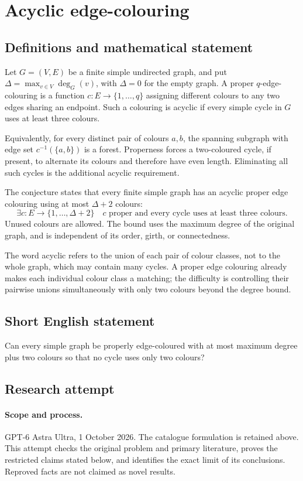 \documentclass[11pt,a4paper]{article}
\begin{document}
\section*{Acyclic edge-colouring}\label{statement}

\subsection{Definitions and mathematical statement}
Let $G=(V,E)$ be a finite simple undirected graph,
and put $\Delta=\max_{v\in V}\deg_G(v)$, with
$\Delta=0$ for the empty graph. A proper
$q$-edge-colouring is a function
$c:E\to\{1,\ldots,q\}$ assigning different
colours to any two edges sharing an endpoint.
Such a colouring is acyclic if every simple
cycle in $G$ uses at least three colours.

Equivalently, for every distinct pair of
colours $a,b$, the spanning subgraph with
edge set $c^{-1}(\{a,b\})$ is a forest.
Properness forces a two-coloured cycle,
if present, to alternate its colours and
therefore have even length. Eliminating
all such cycles is the additional acyclic
requirement.

The conjecture states that every finite
simple graph has an acyclic proper edge
colouring using at most $\Delta+2$ colours:
\[
 \exists c:E\to\{1,\ldots,\Delta+2\}
 \quad c\text{ proper and every cycle uses at least three colours}.
\]
Unused colours are allowed. The bound uses
the maximum degree of the original graph,
and is independent of its order, girth,
or connectedness.

The word acyclic refers to the union of
each pair of colour classes, not to the
whole graph, which may contain many cycles.
A proper edge colouring already makes
each individual colour class a matching;
the difficulty is controlling their pairwise
unions simultaneously with only two colours
beyond the degree bound.
\subsection{Short English statement}
Can every simple graph be properly edge-coloured with at most maximum degree plus two colours so that no cycle uses only two colours?
\subsection{Research attempt}
\paragraph{Scope and process.}
GPT-6 Astra Ultra, 1 October 2026. The catalogue formulation is retained above. This attempt checks the original problem and primary literature, proves the restricted claims stated below, and identifies the exact limit of its conclusions. Reproved facts are not claimed as novel results.
\end{document}
